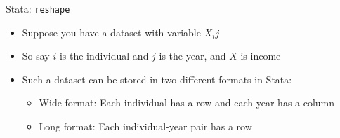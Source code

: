 \documentclass[11pt,notes=hide,aspectratio=169,mathserif]{beamer}
\begin{document}
\begin{frame}{Stata: \texttt{reshape}}
\begin{itemize}
\item Suppose you have a dataset with variable $X_ij$
\item So say $i$ is the individual and $j$ is the year, and $X$ is income 
\item Such a dataset can be stored in two different formats in Stata:
\begin{itemize}
    \pause \item Wide format: Each individual has a row and each year has a column
    \pause \item Long format: Each individual-year pair has a row
\end{itemize}
\end{itemize}
\end{frame}
\end{document}
